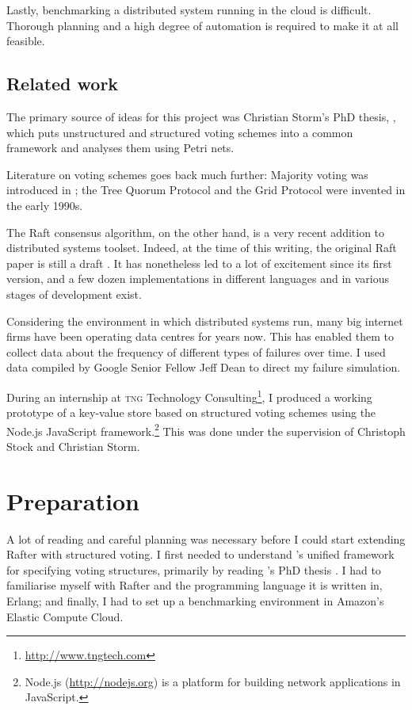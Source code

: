 \documentclass[12pt,chapterprefix=true,toc=bibliography,numbers=noendperiod,
               footnotes=multiple,twoside]{scrreprt}
\begin{document}
Lastly, benchmarking a distributed system running in the cloud is difficult. Thorough planning and a high degree of automation is required to make it at all feasible.

\section{Related work}
\label{sc:related-work}

The primary source of ideas for this project was Christian Storm's PhD thesis,  \parencite{voting}, which puts unstructured and structured voting schemes into a common framework and analyses them using Petri nets.

Literature on voting schemes goes back much further: Majority voting \autocite{majority} was introduced in ; the Tree Quorum Protocol \autocites{tree}{gen-tree} and the Grid Protocol \autocites{grid}{bettergrid} were invented in the early 1990s.

The Raft consensus algorithm, on the other hand, is a very recent addition to distributed systems toolset. Indeed, at the time of this writing, the original Raft paper is still a draft \autocite{raft}. It has nonetheless led to a lot of excitement since its first version, and a few dozen implementations in different languages and in various stages of development exist.

Considering the environment in which distributed systems run, many big internet firms have been operating data centres for years now. This has enabled them to collect data about the frequency of different types of failures over time. I used data compiled by Google Senior Fellow Jeff Dean to direct my failure simulation. \autocite{distr}

During an internship at \textsc{tng} Technology Consulting\footnote{\url{http://www.tngtech.com}}, I produced a working prototype of a key-value store based on structured voting schemes using the Node.js JavaScript framework.\footnote{Node.js (\url{http://nodejs.org}) is a platform for building network applications in JavaScript.} This was done under the supervision of Christoph Stock and Christian Storm.



\chapter{Preparation}
\label{ch:preparation}

A lot of reading and careful planning was necessary before I could start extending Rafter with structured voting. I first needed to understand \citeauthor{generators}'s unified framework for specifying voting structures, primarily by reading \citeauthor{voting}'s PhD thesis \autocite{voting}. I had to familiarise myself with Rafter and the programming language it is written in, Erlang; and finally, I had to set up a benchmarking environment in Amazon's Elastic Compute Cloud.
\end{document}
